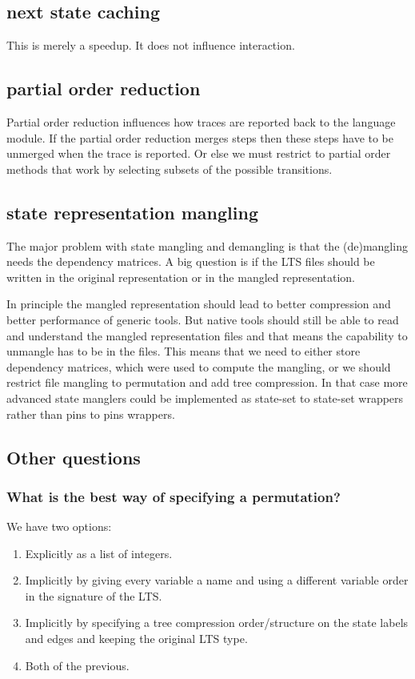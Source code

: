 \subsection{next state caching}

This is merely a speedup. It does not influence interaction.

\subsection{partial order reduction}

Partial order reduction influences how traces are reported back to the language
module. If the partial order reduction merges steps then these steps have to be unmerged
when the trace is reported. Or else we must restrict to partial order methods that
work by selecting subsets of the possible transitions.

\subsection{state representation mangling}

The major problem with state mangling and demangling is that the (de)mangling needs the dependency matrices.
A big question is if the LTS files should be written in the original representation or in the mangled representation.

In principle the mangled representation should lead to better compression and better performance of generic tools.
But native tools should still be able to read and understand the mangled representation files and that means
the capability to unmangle has to be in the files. This means that we need to either store dependency matrices,
which were used to compute the mangling, or we should restrict file mangling to permutation and add tree compression.
In that case more advanced state manglers could be implemented as state-set to state-set wrappers rather than
pins to pins wrappers.


\subsection{Other questions}

\subsubsection{What is the best way of specifying a permutation?}

We have two options:
\begin{enumerate}
\item Explicitly as a list of integers.
\item Implicitly by giving every variable a name and using a different variable order
in the signature of the LTS.
\item Implicitly by specifying a tree compression order/structure on the state labels
and edges and keeping the original LTS type.
\item Both of the previous.
\end{enumerate}



